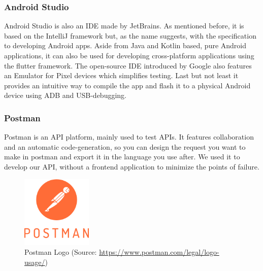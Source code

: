 \subsubsection{Android Studio}
Android Studio is also an IDE made by JetBrains. As mentioned before, it is based on the IntelliJ framework but, as the name suggests, with the specification to developing Android apps. Aside from Java and Kotlin based, pure Android applications, it can also be used for developing cross-platform applications using the flutter framework. The open-source IDE introduced by Google also features an Emulator for Pixel devices which simplifies testing. Last but not least it provides an intuitive way to compile the app and flash it to a physical Android device using ADB and USB-debugging. 

\subsubsection{Postman}
Postman is an API platform, mainly used to test APIs.  It features collaboration and an automatic code-generation, so you can design the request you want to make in postman and export it in the language you use after. We used it to develop our API, without a frontend application to minimize the points of failure.

\begin{figure} [H]
    \center
    \includegraphics [width=0.3\textwidth] {images/Technologies/postmanLogo.png}
    \caption{Postman Logo (Source: \url{https://www.postman.com/legal/logo-usage/})}
\end{figure}